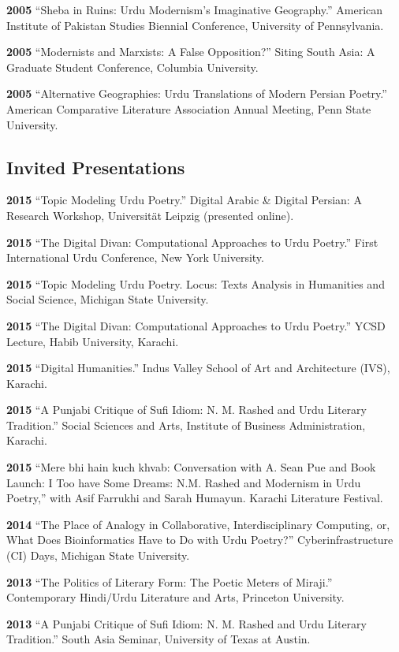 \documentclass[letterpaper,12pt]{article}
\begin{document}
\textbf{2005}
“Sheba in Ruins: Urdu Modernism’s Imaginative Geography.”
American Institute of Pakistan Studies Biennial Conference, University of Pennsylvania.

\textbf{2005}
“Modernists and Marxists: A False Opposition?”
Siting South Asia: A Graduate Student Conference, Columbia University.

\textbf{2005}
“Alternative Geographies: Urdu Translations of Modern Persian Poetry.”
American Comparative Literature Association Annual Meeting, Penn State University.


\subsection{Invited Presentations%
  \label{invited-presentations}%
}

\textbf{2015}
“Topic Modeling Urdu Poetry.” Digital Arabic \& Digital Persian: A Research Workshop, Universität Leipzig (presented online).

\textbf{2015}
“The Digital Divan: Computational Approaches to Urdu Poetry.” First International Urdu Conference, New York University.

\textbf{2015}
“Topic Modeling Urdu Poetry.\textquotedbl{} Locus: Texts Analysis in Humanities and Social Science, Michigan State University.

\textbf{2015}
“The Digital Divan: Computational Approaches to Urdu Poetry.”
YCSD Lecture, Habib University, Karachi.

\textbf{2015}
“Digital Humanities.”
Indus Valley School of Art and Architecture (IVS), Karachi.

\textbf{2015}
“A Punjabi Critique of Sufi Idiom: N. M. Rashed and Urdu Literary Tradition.”
Social Sciences and Arts, Institute of Business Administration, Karachi.

\textbf{2015}
“Mere bhi hain kuch khvab: Conversation with A. Sean Pue and Book Launch: I Too have Some Dreams: N.M. Rashed and Modernism in Urdu Poetry,” with Asif Farrukhi and Sarah Humayun.
Karachi Literature Festival.

\textbf{2014}
“The Place of Analogy in Collaborative, Interdisciplinary Computing,
or,
What Does Bioinformatics Have to Do with Urdu Poetry?”
Cyberinfrastructure (CI) Days, Michigan State University.

\textbf{2013}
“The Politics of Literary Form: The Poetic Meters of Miraji.”
Contemporary Hindi/Urdu Literature and Arts, Princeton University.

\textbf{2013}
“A Punjabi Critique of Sufi Idiom: N. M. Rashed and Urdu Literary Tradition.”
South Asia Seminar, University of Texas at Austin.
\end{document}
